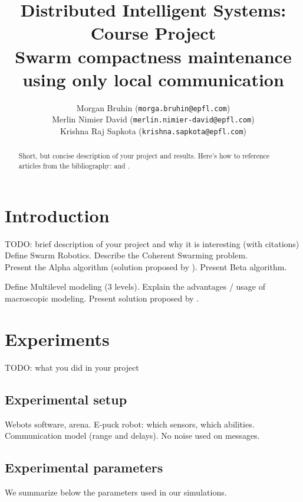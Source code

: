 \documentclass[a4paper, 10pt, conference]{ieeeconf}
\title{ %
  Distributed Intelligent Systems: Course Project\\
  Swarm compactness maintenance using only local communication
}
\author{
  Morgan Bruhin (\texttt{morga.bruhin@epfl.com}) \\
  Merlin Nimier David (\texttt{merlin.nimier-david@epfl.com}) \\
  Krishna Raj Sapkota (\texttt{krishna.sapkota@epfl.com})
}
\begin{document}
\maketitle
\thispagestyle{empty}
\pagestyle{empty}

\begin{abstract}
  Short, but concise description of your project and results.
  Here's how to reference articles from the bibliography: \cite{Nembrini02} and \cite{Winfield08}.
\end{abstract}

\section{Introduction}
  TODO: brief description of your project and why it is interesting (with citations)\\

  Define Swarm Robotics. Describe the Coherent Swarming problem.\\

  Present the Alpha algorithm (solution proposed by \cite{Nembrini02}). Present Beta algorithm.

  Define Multilevel modeling (3 levels). Explain the advantages / usage of macroscopic modeling. Present solution proposed by \cite{Winfield08}.


\section{Experiments}
  TODO: what you did in your project\\

  \subsection{Experimental setup}
  Webots software, arena. E-puck robot: which sensors, which abilities. Communication model (range and delays). No noise used on messages.\\

  \subsection{Experimental parameters}
  We summarize below the parameters used in our simulations.
\end{document}
